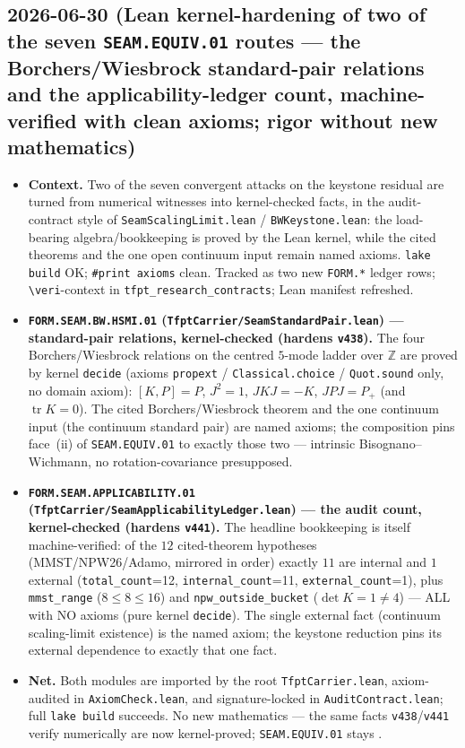 \subsection*{2026-06-30 (Lean kernel-hardening of two of the seven \texttt{SEAM.EQUIV.01} routes --- the Borchers/Wiesbrock standard-pair relations and the applicability-ledger count, machine-verified with clean axioms; rigor without new mathematics)}
\begin{itemize}
\item \textbf{Context.} Two of the seven convergent attacks on the keystone residual are turned from numerical
witnesses into kernel-checked facts, in the audit-contract style of \texttt{SeamScalingLimit.lean} /
\texttt{BWKeystone.lean}: the load-bearing algebra/bookkeeping is proved by the Lean kernel, while the cited
theorems and the one open continuum input remain named axioms. \texttt{lake build} OK; \texttt{\#print axioms}
clean. Tracked as two new \texttt{FORM.*} ledger rows; \texttt{\textbackslash veri}-context in
\texttt{tfpt\_research\_contracts}; Lean manifest refreshed.
\item \textbf{\texttt{FORM.SEAM.BW.HSMI.01} (\texttt{TfptCarrier/SeamStandardPair.lean}) --- standard-pair
relations, kernel-checked (hardens \texttt{v438}).} The four Borchers/Wiesbrock relations on the centred
$5$-mode ladder over $\mathbb{Z}$ are proved by kernel \texttt{decide} (axioms \texttt{propext} /
\texttt{Classical.choice} / \texttt{Quot.sound} only, no domain axiom): $[K,P]{=}P$, $J^2{=}1$, $JKJ{=}{-}K$,
$JPJ{=}P_+$ (and $\operatorname{tr}K{=}0$). The cited Borchers/Wiesbrock theorem and the one continuum input
(the continuum standard pair) are named axioms; the composition pins face~(ii) of \texttt{SEAM.EQUIV.01} to
exactly those two --- intrinsic Bisognano--Wichmann, no rotation-covariance presupposed.
\item \textbf{\texttt{FORM.SEAM.APPLICABILITY.01} (\texttt{TfptCarrier/SeamApplicabilityLedger.lean}) --- the
audit count, kernel-checked (hardens \texttt{v441}).} The headline bookkeeping is itself machine-verified: of
the $12$ cited-theorem hypotheses (MMST/NPW26/Adamo, mirrored in order) exactly $11$ are internal and $1$
external (\texttt{total\_count}=12, \texttt{internal\_count}=11, \texttt{external\_count}=1), plus
\texttt{mmst\_range} ($8\le8\le16$) and \texttt{npw\_outside\_bucket} ($\det K{=}1\neq4$) --- ALL with NO axioms
(pure kernel \texttt{decide}). The single external fact (continuum scaling-limit existence) is the named axiom;
the keystone reduction pins its external dependence to exactly that one fact.
\item \textbf{Net.} Both modules are imported by the root \texttt{TfptCarrier.lean}, axiom-audited in
\texttt{AxiomCheck.lean}, and signature-locked in \texttt{AuditContract.lean}; full \texttt{lake build}
succeeds. No new mathematics --- the same facts \texttt{v438}/\texttt{v441} verify numerically are now
kernel-proved; \texttt{SEAM.EQUIV.01} stays \mO.
\end{itemize}


